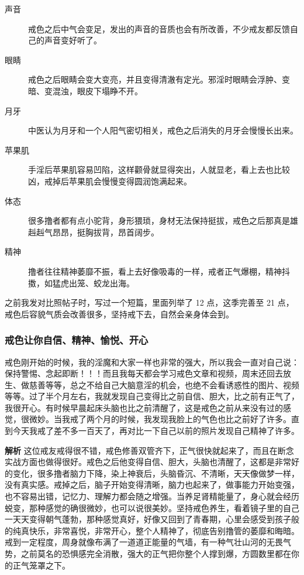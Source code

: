 \begin{multicols}{2}
\begin{description}
        \item[声音] 戒色之后中气会变足，发出的声音的音质也会有所改善，不少戒友都反馈自己的声音变好听了。
        \item[眼睛] 戒色之后眼睛会变大变亮，并且变得清澈有定光。邪淫时眼睛会浮肿、变暗、变混浊，眼皮下塌睁不开。
        \item[月牙] 中医认为月牙和一个人阳气密切相关，戒色之后消失的月牙会慢慢长出来。
        \item[苹果肌] 手淫后苹果肌容易凹陷，这样颧骨就显得突出，人就显老，看上去也比较凶，戒掉后苹果肌会慢慢变得圆润饱满起来。
        \item[体态] 很多撸者都有点小驼背，身形猥琐，身材无法保持挺拔，戒色之后那真是雄赳赳气昂昂，挺胸拔背，昂首阔步。
        \item[精神] 撸者往往精神萎靡不振，看上去好像吸毒的一样，戒者正气爆棚，精神抖擞，如猛虎出笼、蛟龙出海。
    \end{description}
\end{multicols}

之前我发对比照帖子时，写过一个短篇，里面列举了 12 点，这季完善至 21 点，戒色后容貌气质会改善很多，坚持戒下去，自然会亲身体会到。

\subsubsection{戒色让你自信、精神、愉悦、开心}

\begin{case}
    戒色刚开始的时候，我的淫魔和大家一样也非常的强大，所以我会一直对自己说：保持警惕、念起即断！！！而且我每天都会学习戒色文章和视频，周末还回去放生、做慈善等等，总之不给自己大脑意淫的机会，也绝不会看诱惑性的图片、视频等等。过了半个月左右，我就发现自己变得比之前自信、胆大，比之前有正气了，我很开心。有时候早晨起床头脑也比之前清醒了，这是戒色之前从来没有过的感觉，很微妙。当我戒了两个月的时候，我发现我脸上的气色也比之前好了许多。直到今天我戒了差不多一百天了，再对比一下自己以前的照片发现自己精神了许多。

    \textbf{解析} 这位戒友戒得很不错，戒色修善双管齐下，正气很快就起来了，而且在断念实战方面也做得很好。戒色之后他变得自信、胆大，头脑也清醒了，这都是非常好的变化，很多撸者脑力下降，染上神衰后，头脑昏沉、不清晰，天天像做梦一样，没有真实感。戒掉之后，脑子开始变得清晰，脑力也起来了，做事能力开始变强，也不容易出错，记忆力、理解力都会随之增强。当养足肾精能量了，身心就会经历蜕变，那种感觉的确很微妙，也可以说很美妙。坚持戒色养生，看着镜子里的自己一天天变得朝气蓬勃，那种感觉真好，好像又回到了青春期，心里会感受到孩子般的纯真快乐，非常喜悦，非常开心，整个人精神了，彻底告别撸管的萎靡和晦暗。戒到一定程度，周身就像布满了一道道正能量的气墙，有一种气壮山河的无畏气势，之前莫名的恐惧感完全消散，强大的正气把你整个人撑到爆，方圆数里都在你的正气笼罩之下。
\end{case}

